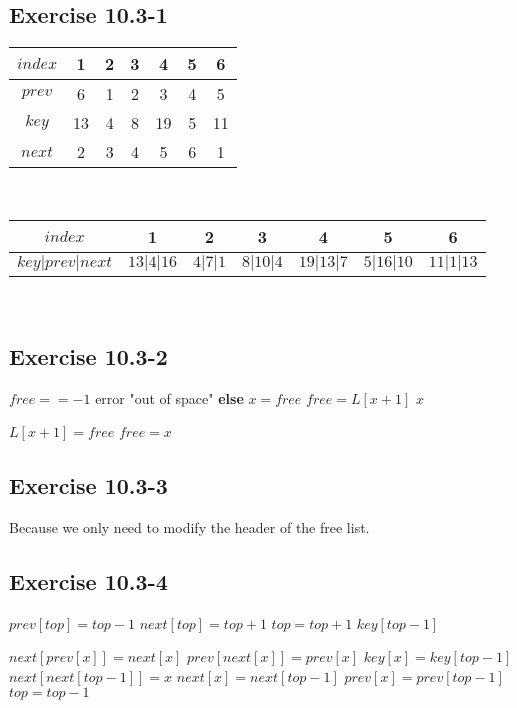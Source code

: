 \documentclass[12pt]{article}
\theoremstyle{definition}
\theoremstyle{remark}
\begin{document}
\subsection*{Exercise 10.3-1}
\begin{tabular}{|c|c|c|c|c|c|c|}\hline
$index$ & 1 & 2 & 3 & 4 & 5 & 6\\ \hline
$prev$ & 6 & 1 & 2 & 3 & 4 & 5\\ \hline
$key$ & 13 & 4 & 8 & 19 & 5 & 11\\ \hline
$next$ & 2 & 3 & 4 & 5 & 6 & 1\\ \hline
\end{tabular}\\
\begin{tabular}{|c|c|c|c|c|c|c|}\hline
$index$ & 1 & 2 & 3 & 4 & 5 & 6\\ \hline
$key|prev|next$ & $13|4|16$ & $4|7|1$ & $8|10|4$ & $19|13|7$ & $5|16|10$ & $11|1|13$\\ \hline
\end{tabular}\\
\subsection*{Exercise 10.3-2}
\begin{codebox}
\li \If $free==-1$
\li \quad error "out of space"
\li \textbf{else}
\li \quad $x=free$
\li \quad $free=L[x+1]$
\li \quad \Return $x$
\end{codebox}
\begin{codebox}
\li $L[x+1]=free$
\li $free=x$
\end{codebox}
\subsection*{Exercise 10.3-3}
Because we only need to modify the header of the free list.
\subsection*{Exercise 10.3-4}
\begin{codebox}
\li $prev[top]=top-1$
\li $next[top]=top+1$
\li $top=top+1$
\li \Return $key[top-1]$
\end{codebox}
\begin{codebox}
\li $next[prev[x]]=next[x]$
\li $prev[next[x]]=prev[x]$
\li $key[x]=key[top-1]$
\li $next[next[top-1]]=x$
\li $next[x]=next[top-1]$
\li $prev[x]=prev[top-1]$
\li $top=top-1$
\end{codebox}
\end{document}
